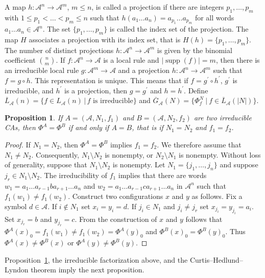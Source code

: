 \documentclass[11pt,a4paper]{article}
\newcommand{\rev}[1]{{\color{blue}#1}}
\newcommand{\rev}[1]{{\color{black}#1}}
\newcommand{\supp}{\mathop{\mathrm{supp}}}
\newtheorem{prop}{Proposition}
\begin{document}
A map $h: \mathcal{A}^n \to \mathcal{A}^m$, $m \le n$, is called a projection if
there are integers $p_1, \ldots, p_{m}$ with $1 \leq p_1 < \ldots < p_{m} \leq n$ such that
$h(a_1\ldots a_{n}) = a_{p_1}\ldots a_{p_{m}}$ for all words $a_1\ldots a_{n} \in \mathcal{A}^n$.
The set $\{p_1, \ldots, p_{m}\}$ is called the index set of the projection.
The map $H$ associates a projection with its index set, that is $H(h) = \{p_1, \ldots, p_{m}\}$.
The number of distinct projections $h : \mathcal{A}^n \to \mathcal{A}^m$ is given by
the binomial coefficient $\binom{n}{m}$.
If $f: \mathcal{A}^n \to \mathcal{A}$ is a local rule and $|\supp(f)| = m$,
then there is an irreducible local rule $g: \mathcal{A}^m \to \mathcal{A}$ and a projection
$h : \mathcal{A}^n \to \mathcal{A}^m$ such
that $f = g \circ h$.
This representation is unique.
This means that if $f = g^\prime \circ h^\prime$, $g^\prime$ is irreducible, and $h^\prime$ is a projection,
then $g = g^\prime$ and $h = h^\prime$.
Define $\overline{L}_\mathcal{A}(n) = \{f \in L_\mathcal{A}(n) \, | \, \mbox{$f$ is irreducible}  \}$ and
$\overline{G}_\mathcal{A}(N) = \{ \Phi_f^N \ | \ f \in \overline{L}_\mathcal{A}(|N|) \}$.
\begin{prop}
\label{prop:uniqueness}
If $A=(\mathcal{A}, N_1, f_1)$ and $B=(\mathcal{A}, N_2, f_2)$ are two irreducible CAs,
then $\Phi^A = \Phi^B$ if and only if $A=B$, that is if $N_1 = N_2$ and $f_1 = f_2$.
\end{prop}
\begin{proof}
If $N_1 = N_2$, then $\Phi^A = \Phi^B$ implies $f_1 = f_2$.
We therefore assume that $N_1 \neq N_2$.
Consequently, $N_1 \setminus N_2$ is nonempty, or $N_2 \setminus N_1$ is nonempty.
Without loss of generality, suppose that $N_1 \setminus N_2$ is nonempty.
Let $N_1 = \{j_1, \ldots, j_{n} \}$ and suppose $j_r \in N_1 \setminus N_2$.
The irreducibility of $f_1$ implies that there are words
$w_1 = a_1 \ldots a_{r-1}ba_{r+1} \ldots a_{n}$ and
$w_2 =a_1 \ldots a_{r-1}ca_{r+1} \ldots a_{n}$ in $\mathcal{A}^n$
such that $f_1(w_1) \neq f_1(w_2)$.
Construct two configurations $x$ and $y$ as follows.
Fix a symbol $d \in \mathcal{A}$.
If $i \not\in N_1$ set $x_i = y_i = d$.
If $j_i \in N_1$ and $j_i \neq j_r$ set $x_{j_i} = y_{j_i} = a_i$.
Set $x_{j_r} = b$ and $y_{j_r} = c$.
From the construction of $x$ and $y$ follows that $\Phi^A(x)_0 = f_1(w_1) \neq f_1(w_2) = \Phi^A(y)_0$ and
$\Phi^B(x)_0 = \Phi^B(y)_0$.
Thus $\Phi^A(x) \neq \Phi^B(x)$ or $\Phi^A(y) \neq \Phi^B(y)$.
\end{proof}
\rev{Proposition~\ref{prop:uniqueness}, the irreducible factorization above, and the Curtis--Hedlund--Lyndon theorem imply the next proposition.}
\end{document}
